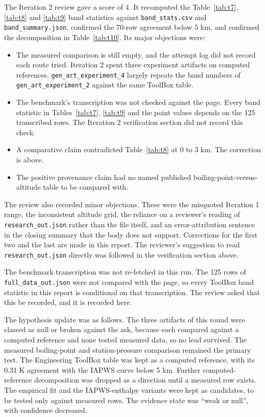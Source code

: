 \documentclass[11pt,letterpaper]{article}
\begin{document}
The Iteration 2 review gave a score of 4. It recomputed the Table~\ref{tab:t7}, \ref{tab:t8} and \ref{tab:t9} band statistics against \texttt{band\_stats.csv} and \texttt{band\_summary.json}, confirmed the 70-row agreement below 5 km, and confirmed the decomposition in Table~\ref{tab:t10}. Its major objections were:
\begin{itemize}
\item The measured comparison is still empty, and the attempt log did not record each route tried. Iteration 2 spent three experiment artifacts on computed references. \texttt{gen\_art\_experiment\_4} largely repeats the band numbers of \texttt{gen\_art\_experiment\_2} against the same ToolBox table.
\item The benchmark's transcription was not checked against the page. Every band statistic in Tables~\ref{tab:t7}, \ref{tab:t9} and the point values depends on the 125 transcribed rows. The Iteration 2 verification section did not record this check.
\item A comparative claim contradicted Table~\ref{tab:t8} at 0 to 3 km. The correction is above.
\item The positive provenance claim had no named published boiling-point-versus-altitude table to be compared with.
\end{itemize}
The review also recorded minor objections. These were the misquoted Iteration 1 range, the inconsistent altitude grid, the reliance on a reviewer's reading of \texttt{research\_out.json} rather than the file itself, and an error-attribution sentence in the closing summary that the body does not support. Corrections for the first two and the last are made in this report. The reviewer's suggestion to read \texttt{research\_out.json} directly was followed in the verification section above.

The benchmark transcription was not re-fetched in this run. The 125 rows of \texttt{full\_data\_out.json} were not compared with the page, so every ToolBox band statistic in this report is conditional on that transcription. The review asked that this be recorded, and it is recorded here.

The hypothesis update was as follows. The three artifacts of this round were classed as null or broken against the ask, because each compared against a computed reference and none tested measured data, so no lead survived. The measured boiling-point and station-pressure comparison remained the primary test. The Engineering ToolBox table was kept as a computed reference, with its 0.31 K agreement with the IAPWS curve below 5 km. Further computed-reference decomposition was dropped as a direction until a measured row exists. The empirical fit and the IAPWS-enthalpy variants were kept as candidates, to be tested only against measured rows. The evidence state was ``weak or null'', with confidence decreased.
\end{document}
